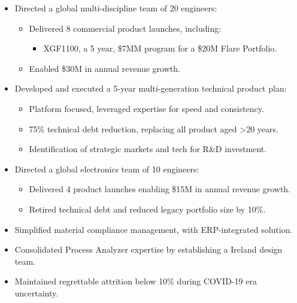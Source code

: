 \begin{itemize}
	\vspace{-\topsep} %
	\item Directed a global multi-discipline team of 20 engineers:
	\vspace{-\topsep} %
	\begin{itemize}
		\item Delivered 8 commercial product launches, including:
		\begin{itemize}
			\item XGF1100, a 5 year, \$7MM program for a \$20M Flare Portfolio.
		\end{itemize}
		\item Enabled \$30M in annual revenue growth.
	\end{itemize}
	\vspace{-\topsep} %
	\item Developed and executed a 5-year multi-generation technical product plan:
	\vspace{-\topsep} %
	\begin{itemize}
		\item Platform focused, leveraged expertise for speed and consistency.
		\item 75\% technical debt reduction, replacing all product aged >20 years.
		\item Identification of strategic markets and tech for R\&D investment.
	\end{itemize}
\end{itemize}
\begin{itemize}
	\vspace{-\topsep} %
	\item Directed a global electronics team of 10 engineers:
	\vspace{-\topsep} %
	\begin{itemize}
		\item Delivered 4 product launches enabling \$15M in annual revenue growth.
		\item Retired technical debt and reduced legacy portfolio size by 10\%.
	\end{itemize}
	\vspace{-\topsep} %
	\item Simplified material compliance management, with ERP-integrated solution.
	\item Consolidated Process Analyzer expertise by establishing a Ireland design team.
	\item Maintained regrettable attrition below 10\% during COVID-19 era uncertainty.
\end{itemize}

